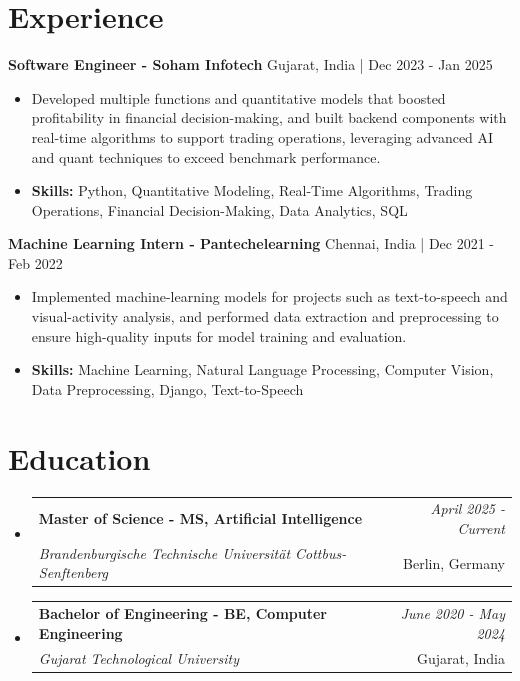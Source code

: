 \documentclass[a4paper,11pt]{article}
\makeatletter
\newcommand{\resumeSubheading}[4]{
\vspace{0.5mm}\item
    \begin{tabular*}{\linewidth}[t]{l@{\extracolsep{\fill}}r}
        \textbf{#1} & \textit{\footnotesize{#4}} \\
        \textit{\footnotesize{#3}} &  \footnotesize{#2}\\
    \end{tabular*}
    \vspace{-2.4mm}
}
\makeatother
\begin{document}
\section{\textbf{Experience}}


\vspace{1mm}
  \textbf{Software Engineer - Soham Infotech} \hfill Gujarat, India | Dec 2023 - Jan 2025
\vspace{-1.5mm} %
\begin{itemize}
  \item Developed multiple functions and quantitative models that boosted profitability in financial decision-making, and built backend components with real-time algorithms to support trading operations, leveraging advanced AI and quant techniques to exceed benchmark performance.

\vspace{-2mm}
  \item \textbf{Skills:} Python, Quantitative Modeling, Real-Time Algorithms, Trading Operations, Financial Decision-Making, Data Analytics, SQL
\end{itemize}

\vspace{1mm}
  \textbf{Machine Learning Intern - Pantechelearning} \hfill Chennai, India | Dec 2021 - Feb 2022
\vspace{-1.5mm} %
\begin{itemize}
  \item Implemented machine-learning models for projects such as text-to-speech and visual-activity analysis, and performed data extraction and preprocessing to ensure high-quality inputs for model training and evaluation.
\vspace{-2mm}
  \item \textbf{Skills:} Machine Learning, Natural Language Processing, Computer Vision, Data Preprocessing, Django, Text-to-Speech
\end{itemize}\section{\textbf{Education}}
\vspace{-0.4mm}

\begin{itemize}[leftmargin=0.15in, label={}]
\resumeSubheading
{Master of Science - MS, Artificial Intelligence }{Berlin, Germany}
{Brandenburgische Technische Universität Cottbus-Senftenberg  }{April 2025 - Current}

\vspace{1.0mm} %
\resumeSubheading
{Bachelor of Engineering - BE, Computer Engineering  }{Gujarat, India}
{Gujarat Technological University }{June 2020 - May 2024}

\end{itemize}
\end{document}
